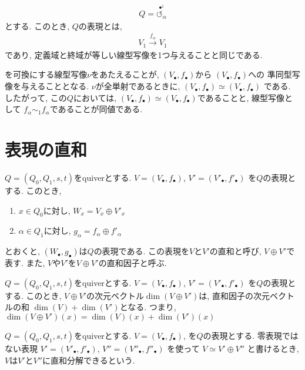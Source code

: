 \begin{example}
  \begin{align*}
    Q=
    \stackrel{\bullet^{1}}{\circlearrowleft_{\alpha}}
  \end{align*}
  とする.
  このとき, $Q$の表現とは,
  \begin{align*}
    V_1 \xrightarrow{f_\alpha} V_{1}
  \end{align*}
  であり,
  定義域と終域が等しい線型写像を1つ与えることと同じである.
  \begin{center}
  \end{center}
  を可換にする線型写像$\nu$をあたえることが,
  $(V_\bullet,f_\bullet)$から
  $(V_\bullet,f_\bullet)$への
  準同型写像を与えることとなる.
  $\nu$が全単射であるときに,
  $(V_\bullet,f_\bullet)\simeq (V_\bullet,f_\bullet)$
  である.
  したがって, この$Q$においては,
  $(V_\bullet,f_\bullet)\simeq (V_\bullet,f_\bullet)$であることと,
  線型写像として
  $f_\alpha \sim_1 f_\alpha$であることが同値である.  
\end{example}

\section{表現の直和}

\begin{definition}
  $Q=(Q_0,Q_1,s,t)$をquiverとする.
  $V=(V_\bullet,f_\bullet)$,
  $V'=(V'_\bullet,f'_\bullet)$
  を$Q$の表現とする.
  このとき,
  \begin{enumerate}
  \item $x\in Q_0$に対し, $W_x=V_x\oplus V'_x$
  \item $\alpha\in Q_1$に対し, $g_\alpha=f_\alpha\oplus f'_\alpha$
  \end{enumerate}
  とおくと, $(W_\bullet,g_\bullet)$は$Q$の表現である.
  この表現を$V$と$V'$の直和と呼び, $V\oplus V'$で表す.
  また, $V$や$V'$を$V\oplus V'$の直和因子と呼ぶ.
\end{definition}
\begin{remark}
  $Q=(Q_0,Q_1,s,t)$をquiverとする.
  $V=(V_\bullet,f_\bullet)$,
  $V'=(V'_\bullet,f'_\bullet)$
  を$Q$の表現とする.
  このとき, $V\oplus V'$の次元ベクトル$\dim(V\oplus V')$は,
  直和因子の次元ベクトルの和
  $\dim(V)+\dim(V')$となる.
  つまり,
  $\dim(V\oplus V')(x)=\dim(V)(x)+\dim(V')(x)$
\end{remark}
\begin{definition}
  $Q=(Q_0,Q_1,s,t)$をquiverとする.
  $V=(V_\bullet,f_\bullet)$,
  を$Q$の表現とする.
  零表現ではない表現
  $V'=(V'_\bullet,f'_\bullet)$,
  $V''=(V''_\bullet,f''_\bullet)$
  を使って
  $V\simeq V'\oplus V''$
  と書けるとき,
  $V$は$V'$と$V''$に直和分解できるという.
\end{definition}

